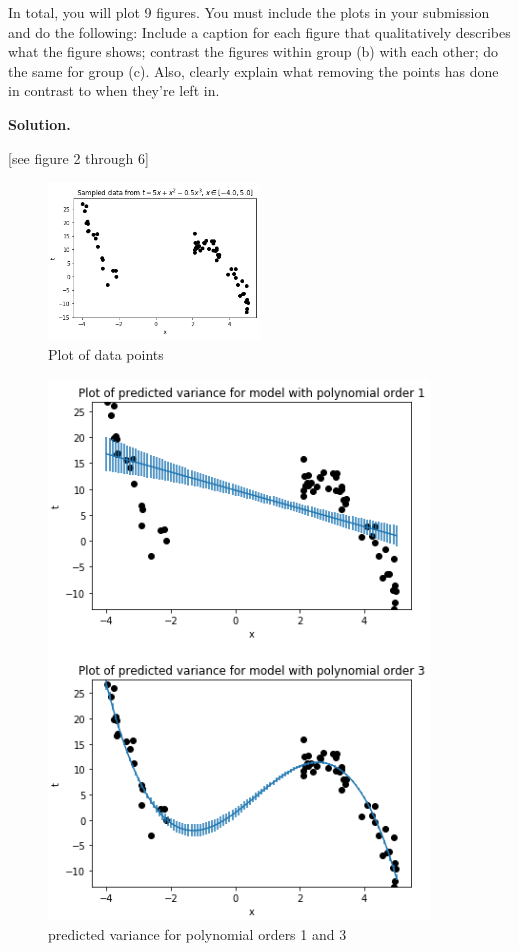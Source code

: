 \documentclass[10pt]{article}
\begin{document}
\begin{itemize}
In total, you will plot 9 figures.  You must include the plots in your submission and do the following: Include a caption for each figure that qualitatively describes what the figure shows; contrast the figures within group (b) with each other; do the same for group (c).  Also, clearly explain what removing the points has done in contrast to when they're left in.

{\bf Solution.}

[see figure 2 through 6]

\begin{figure}
\centering
\includegraphics[width=0.5\textwidth]{5a.png}
\caption{\label{fig:2}Plot of data points}
\end{figure}

\begin{figure}
\centering
\includegraphics[width=0.9\textwidth]{5b.png}
\caption{\label{fig:3}predicted variance for polynomial orders 1 and 3}
\end{figure}


\end{itemize}
\end{document}
